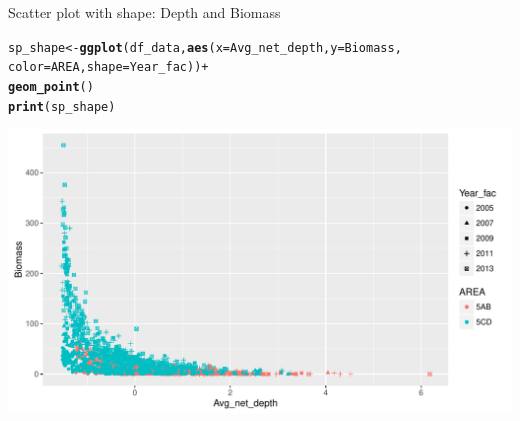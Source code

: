 \documentclass{beamer}\usepackage[]{graphicx}\usepackage[]{color}
\makeatletter
\newcommand{\hlopt}[1]{\textcolor[rgb]{0,0,0}{#1}}%
\newcommand{\hlstd}[1]{\textcolor[rgb]{0.345,0.345,0.345}{#1}}%
\newcommand{\hlkwb}[1]{\textcolor[rgb]{0.69,0.353,0.396}{#1}}%
\newcommand{\hlkwc}[1]{\textcolor[rgb]{0.333,0.667,0.333}{#1}}%
\newcommand{\hlkwd}[1]{\textcolor[rgb]{0.737,0.353,0.396}{\textbf{#1}}}%
\newenvironment{kframe}{%
 \def\at@end@of@kframe{}%
 \ifinner\ifhmode%
  \def\at@end@of@kframe{\end{minipage}}%
  \begin{minipage}{\columnwidth}%
 \fi\fi%
 \def\FrameCommand##1{\hskip\@totalleftmargin \hskip-\fboxsep
 \colorbox{shadecolor}{##1}\hskip-\fboxsep
     \hskip-\linewidth \hskip-\@totalleftmargin \hskip\columnwidth}%
 \MakeFramed {\advance\hsize-\width
   \@totalleftmargin\z@ \linewidth\hsize
   \@setminipage}}%
 {\par\unskip\endMakeFramed%
 \at@end@of@kframe}
\newenvironment{knitrout}{}{} %
\makeatother
\begin{document}
\begin{frame}[fragile]{Scatter plot with shape: Depth and Biomass}
\begin{knitrout}\footnotesize
{}\color{fgcolor}\begin{kframe}
\begin{alltt}
\hlstd{sp_shape} \hlkwb{<-} \hlkwd{ggplot}\hlstd{(df_data,} \hlkwd{aes}\hlstd{(}\hlkwc{x}\hlstd{=Avg_net_depth,} \hlkwc{y}\hlstd{=Biomass,}
                                \hlkwc{color}\hlstd{=AREA,} \hlkwc{shape}\hlstd{=Year_fac))} \hlopt{+}
  \hlkwd{geom_point}\hlstd{()}
\hlkwd{print}\hlstd{(sp_shape)}
\end{alltt}
\end{kframe}

{\centering \includegraphics[width=.9\linewidth]{figure/scatter_plot_shape-1} 

}



\end{knitrout}
\end{frame}
\end{document}

